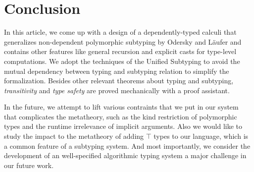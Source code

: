 \section{Conclusion}

In this article, we come up with a design of a dependently-typed calculi \name
that generalizes non-dependent polymorphic subtyping by Odersky and
L\"aufer\cite{odersky1996putting} and contains other features like general
recursion and explicit casts for type-level computations.
We adopt the techniques of the Unified Subtyping\cite{yang2017unifying} to
avoid the mutual dependency between typing and subtyping relation to simplify
the formalization. Besides other relevant theorems about typing and subtyping,
\emph{transitivity} and \emph{type safety} are proved mechanically with a proof assistant.

In the future, we attempt to lift various contraints that we put in our system
that complicates the metatheory, such as the kind restriction of polymorphic
types and the runtime irrelevance of implicit arguments. Also we would like to
study the impact to the metatheory of adding $\top$ types to our language,
which is a common feature of a subtyping system.
And most importantly, we consider the development
of an well-specified algorithmic typing system a major challenge in our future
work.